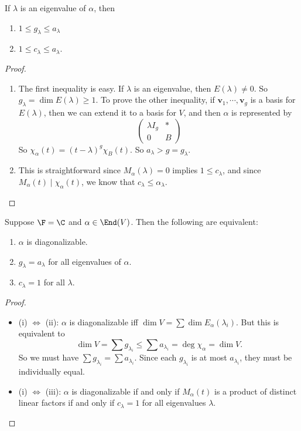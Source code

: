 \documentclass[a4paper]{article}
\begin{document}
\begin{lemma}
  If $\lambda$ is an eigenvalue of $\alpha$, then
  \begin{enumerate}
    \item $1 \leq g_\lambda \leq a_\lambda$
    \item $1 \leq c_\lambda \leq a_\lambda$.
  \end{enumerate}
\end{lemma}
\begin{proof}\leavevmode
  \begin{enumerate}
    \item The first inequality is easy. If $\lambda$ is an eigenvalue, then $E(\lambda) \not= 0$. So $g_\lambda = \dim E(\lambda) \geq 1$. To prove the other inequality, if $\mathbf{v}_1, \cdots, \mathbf{v}_g$ is a basis for $E(\lambda)$, then we can extend it to a basis for $V$, and then $\alpha$ is represented by
      \[
        \begin{pmatrix}
          \lambda I_g & *\\
          0 & B
        \end{pmatrix}
      \]
      So $\chi_\alpha(t) = (t - \lambda)^g \chi_B(t)$. So $a_\lambda > g = g_\lambda$.
    \item This is straightforward since $M_\alpha(\lambda) = 0$ implies $1 \leq c_\lambda$, and since $M_\alpha(t) \mid \chi_\alpha(t)$, we know that $c_\lambda \leq \alpha_\lambda$.\qedhere
  \end{enumerate}
\end{proof}

\begin{lemma}
  Suppose $\F = \C$ and $\alpha \in \End(V)$. Then the following are equivalent:
  \begin{enumerate}
    \item $\alpha$ is diagonalizable.
    \item $g_\lambda = a_\lambda$ for all eigenvalues of $\alpha$.
    \item $c_\lambda = 1$ for all $\lambda$.
  \end{enumerate}
\end{lemma}

\begin{proof}\leavevmode
  \begin{itemize}
    \item (i) $\Leftrightarrow$ (ii): $\alpha$ is diagonalizable iff $\dim V = \sum \dim E_\alpha (\lambda_i)$. But this is equivalent to
      \[
       \dim V = \sum g_{\lambda_i} \leq \sum a_{\lambda_i} = \deg \chi_\alpha = \dim V.
     \]
     So we must have $\sum g_{\lambda_i} = \sum a_{\lambda_i}$. Since each $g_{\lambda_i}$ is at most $a_{\lambda_i}$, they must be individually equal.

   \item (i) $\Leftrightarrow$ (iii): $\alpha$ is diagonalizable if and only if $M_\alpha(t)$ is a product of distinct linear factors if and only if $c_\lambda = 1$ for all eigenvalues $\lambda$.\qedhere
  \end{itemize}
\end{proof}
\end{document}

